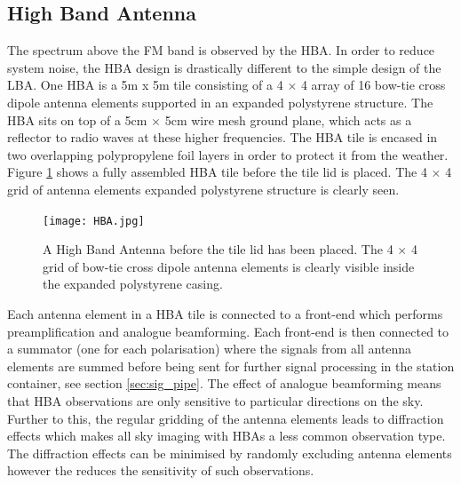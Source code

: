 \subsection{High Band Antenna}
The spectrum above the FM band is observed by the HBA. In order to reduce system noise, the HBA design is drastically different to the simple design of the LBA. One HBA is a 5m x 5m tile consisting of a 4 $\times$ 4 array of 16 bow-tie cross dipole antenna elements supported in an expanded polystyrene structure. The HBA sits on top of a 5cm $\times$ 5cm wire mesh ground plane, which acts as a reflector to radio waves at these higher frequencies. The HBA tile is encased in two overlapping polypropylene foil layers in order to protect it from the weather. Figure \ref{fig:HBA} shows a fully assembled HBA tile before the tile lid is placed. The 4 $\times$ 4 grid of antenna elements expanded polystyrene structure is clearly seen.

\begin{figure}
\centering
\texttt{[image: HBA.jpg]}
\caption[The inside of a High Band Antenna tile.]{A High Band Antenna before the tile lid has been placed. The  4 $\times$ 4 grid of bow-tie cross dipole antenna elements is clearly visible inside the expanded polystyrene casing.}
\label{fig:HBA}
\end{figure}

Each antenna element in a HBA tile is connected to a front-end which performs preamplification and analogue beamforming. Each front-end is then connected to a summator (one for each polarisation) where the signals from all antenna elements are summed before being sent for further signal processing in the station container, see section \ref{sec:sig_pipe}. The effect of analogue beamforming means that HBA observations are only sensitive to particular directions on the sky. Further to this, the regular gridding of the antenna elements leads to diffraction effects which makes all sky imaging with HBAs a less common observation type. The diffraction effects can be minimised by randomly excluding antenna elements however the reduces the sensitivity of such observations.

